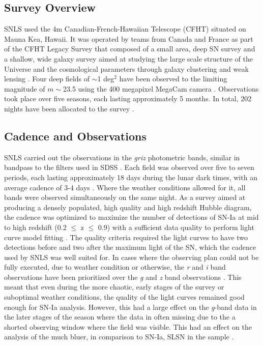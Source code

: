 \subsection{Survey Overview}
SNLS used the 4m Canadian-French-Hawaiian Telescope (CFHT) situated on Mauna Kea, Hawaii. It was operated by teams from Canada and France as part of the CFHT Legacy Survey that composed of a small area, deep SN survey and a shallow, wide galaxy survey aimed at studying the large scale structure of the Universe and the cosmological parameters through galaxy clustering and weak lensing \citep{Pritchet2004,Astier2006}. Four deep fields of $\sim$1 deg$^2$ have been observed to the limiting magnitude of $m\sim$23.5 using the 400 megapixel MegaCam camera \citep{Boulade2003}. Observations took place over five seasons, each lasting approximately 5 months. In total, 202 nights have been allocated to the survey \citep{Pritchet2004}.

\subsection{Cadence and Observations}
SNLS carried out the observations in the \textit{griz} photometric bands, similar in bandpass to the filters used in SDSS . Each field was observed over five to seven periods, each lasting approximately 18 days during the lunar dark times, with an average cadence of 3-4 days \citep{Astier2006,Guy2010}. Where the weather conditions allowed for it, all bands were observed simultaneously on the same night. As a survey aimed at producing a densely populated, high quality and high redshift Hubble diagram, the cadence was optimized to maximize the number of detections of SN-Ia at mid to high redshift (0.2 $\leq$ z $\leq$ 0.9) with a sufficient data quality to perform light curve model fitting \citep{Pritchet2004}. The quality criteria required the light curves to have two detections before and two after the maximum light of the SN, which the cadence used by SNLS was well suited for. In cases where the observing plan could not be fully executed, due to weather condition or otherwise, the \textit{r} and \textit{i} band observations have been prioritized over the \textit{g} and \textit{z} band observations \citep{Guy2010}. This meant that even during the more chaotic, early stages of the survey or suboptimal weather conditions, the quality of the light curves remained good enough for SN-Ia analysis. However, this had a large effect on the \textit{g}-band data in the later stages of the season where the data in often missing due to the a shorted observing window where the field was visible. This had an effect on the analysis of the much bluer, in comparison to SN-Ia, SLSN in the sample \citep{Prajs2016}.

